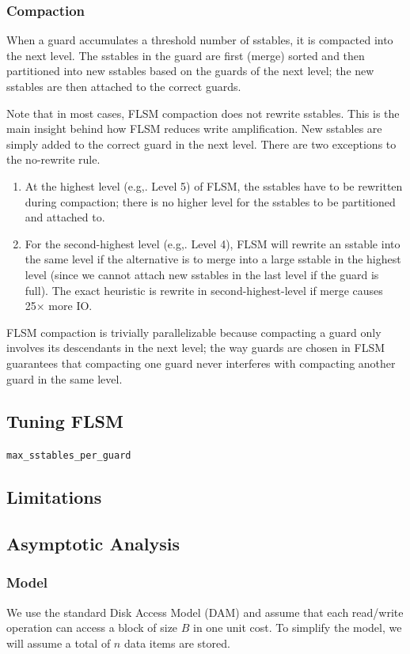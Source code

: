 \documentclass[11pt]{article}
\begin{document}
\subsubsection{Compaction}
\label{sec:orgf2be6f8}
When a guard accumulates a threshold number of sstables, it is compacted into the next level. The
sstables in the guard are first (merge) sorted and then partitioned into new sstables based on the
guards of the next level; the new sstables are then attached to the correct guards.

Note that in most cases, FLSM compaction does not rewrite sstables. This is the main insight behind
how FLSM reduces write amplification. New sstables are simply added to the correct guard in the next
level. There are two exceptions to the no-rewrite rule.
\begin{enumerate}
\item At the highest level (e.g,. Level 5) of FLSM, the sstables have to be rewritten during compaction;
there is no higher level for the sstables to be partitioned and attached to.
\item For the second-highest level (e.g,. Level 4), FLSM will rewrite an sstable into the same level if
the alternative is to merge into a large sstable in the highest level (since we cannot attach new
sstables in the last level if the guard is full). The exact heuristic is rewrite in
second-highest-level if merge causes 25× more IO.
\end{enumerate}

FLSM compaction is trivially parallelizable because compacting a guard only involves its descendants
in the next level; the way guards are chosen in FLSM guarantees that compacting one guard never
interferes with compacting another guard in the same level.
\subsection{Tuning FLSM}
\label{sec:org8434b7a}
\texttt{max\_sstables\_per\_guard}
\subsection{Limitations}
\label{sec:org6b077fb}
\subsection{Asymptotic Analysis}
\label{sec:org9c6d9b1}
\subsubsection{Model}
\label{sec:orgb6eec5b}
We use the standard Disk Access Model (DAM) and assume that each read/write operation can
access a block of size \(B\) in one unit cost. To simplify the model, we will assume a total of \(n\)
data items are stored.
\end{document}

